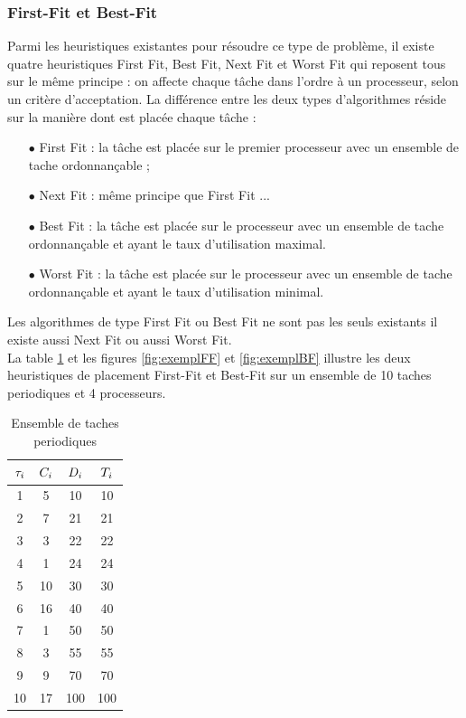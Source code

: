 \subsubsection{First-Fit et Best-Fit}
\vspace{-1cm}
Parmi les heuristiques existantes pour résoudre ce type de problème, il existe quatre heuristiques First Fit, Best Fit, Next Fit et Worst Fit qui reposent tous sur le même principe : on affecte chaque tâche dans l'ordre à un processeur, selon un critère d'acceptation.
La différence entre les deux types d'algorithmes réside sur la manière dont est placée chaque tâche :
\begin{itemize}
\item[$\bullet$] First Fit : la tâche est placée sur le premier processeur avec un ensemble de tache ordonnançable ;
\item[$\bullet$] Next Fit : même principe que First Fit ...
\item[$\bullet$] Best Fit : la tâche est placée sur le processeur avec un ensemble de tache ordonnançable et ayant le taux d'utilisation maximal.
\item[$\bullet$] Worst Fit : la tâche est placée sur le processeur avec un ensemble de tache ordonnançable et ayant le taux d'utilisation minimal.
\end{itemize}
Les algorithmes de type First Fit ou Best Fit ne sont pas les seuls existants il existe aussi Next Fit ou aussi Worst Fit.
\\ \indent La table \ref{tab:exampleFFBF} et les figures \ref{fig:exemplFF} et \ref{fig:exemplBF} illustre les deux heuristiques de placement First-Fit et Best-Fit sur un ensemble de 10 taches periodiques et 4 processeurs.

\begin{table}[!h]
\begin{center}
\begin{tabular}{|c|c|c|c|}
 \hline$\tau_{i}$ & $C_{i}$ & $D_{i}$ & $T_{i}$ \\ 
 \hline1 & 5 & 10 & 10 \\ 
 \hline 2 & 7 & 21 & 21 \\ 
 \hline 3 & 3 & 22 & 22 \\ 
 \hline 4 & 1 & 24 & 24 \\ 
 \hline 5 & 10 & 30 & 30 \\ 
 \hline 6 & 16 & 40 & 40 \\ 
 \hline 7 & 1 & 50 & 50 \\ 
 \hline 8 & 3 & 55 & 55 \\ 
 \hline 9 & 9 & 70 & 70 \\ 
 \hline 10 & 17 & 100 & 100 \\ 
 \hline 
 \end{tabular}
\end{center}
\caption{Ensemble de taches periodiques} \label{tab:exampleFFBF}
\end{table}

